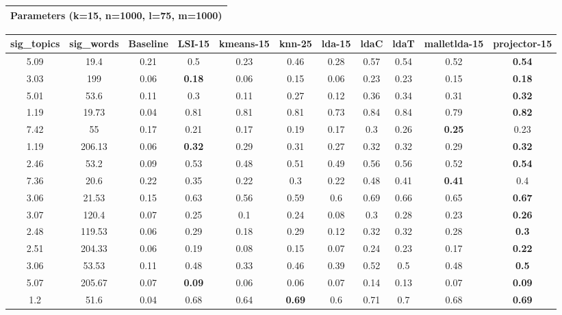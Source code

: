 \documentclass[10pt]{article}
\begin{document}
\begin{tabular}{|c|}
\hline 
 Parameters (k=15, n=1000, l=75, m=1000) \\
 \hline 

\end{tabular}



\begin{tabular}{|c|c|c|c|c|c|c|c|c|c|c|}
\hline 
sig\_topics &sig\_words &Baseline &LSI-15 &kmeans-15 &knn-25 &lda-15 &ldaC &ldaT &malletlda-15 &projector-15 \\
 \hline 
5.09  &19.4  &0.21  &0.5  &0.23  &0.46  &0.28  &0.57  &0.54  &0.52  &\textbf{0.54}
  \\
 \hline 
3.03  &199  &0.06  &\textbf{0.18}
  &0.06  &0.15  &0.06  &0.23  &0.23  &0.15  &\textbf{0.18}
  \\
 \hline 
5.01  &53.6  &0.11  &0.3  &0.11  &0.27  &0.12  &0.36  &0.34  &0.31  &\textbf{0.32}
  \\
 \hline 
1.19  &19.73  &0.04  &0.81  &0.81  &0.81  &0.73  &0.84  &0.84  &0.79  &\textbf{0.82}
  \\
 \hline 
7.42  &55  &0.17  &0.21  &0.17  &0.19  &0.17  &0.3  &0.26  &\textbf{0.25}
  &0.23  \\
 \hline 
1.19  &206.13  &0.06  &\textbf{0.32}
  &0.29  &0.31  &0.27  &0.32  &0.32  &0.29  &\textbf{0.32}
  \\
 \hline 
2.46  &53.2  &0.09  &0.53  &0.48  &0.51  &0.49  &0.56  &0.56  &0.52  &\textbf{0.54}
  \\
 \hline 
7.36  &20.6  &0.22  &0.35  &0.22  &0.3  &0.22  &0.48  &0.41  &\textbf{0.41}
  &0.4  \\
 \hline 
3.06  &21.53  &0.15  &0.63  &0.56  &0.59  &0.6  &0.69  &0.66  &0.65  &\textbf{0.67}
  \\
 \hline 
3.07  &120.4  &0.07  &0.25  &0.1  &0.24  &0.08  &0.3  &0.28  &0.23  &\textbf{0.26}
  \\
 \hline 
2.48  &119.53  &0.06  &0.29  &0.18  &0.29  &0.12  &0.32  &0.32  &0.28  &\textbf{0.3}
  \\
 \hline 
2.51  &204.33  &0.06  &0.19  &0.08  &0.15  &0.07  &0.24  &0.23  &0.17  &\textbf{0.22}
  \\
 \hline 
3.06  &53.53  &0.11  &0.48  &0.33  &0.46  &0.39  &0.52  &0.5  &0.48  &\textbf{0.5}
  \\
 \hline 
5.07  &205.67  &0.07  &\textbf{0.09}
  &0.06  &0.06  &0.07  &0.14  &0.13  &0.07  &\textbf{0.09}
  \\
 \hline 
1.2  &51.6  &0.04  &0.68  &0.64  &\textbf{0.69}
  &0.6  &0.71  &0.7  &0.68  &\textbf{0.69}

\end{tabular}
\end{document}
